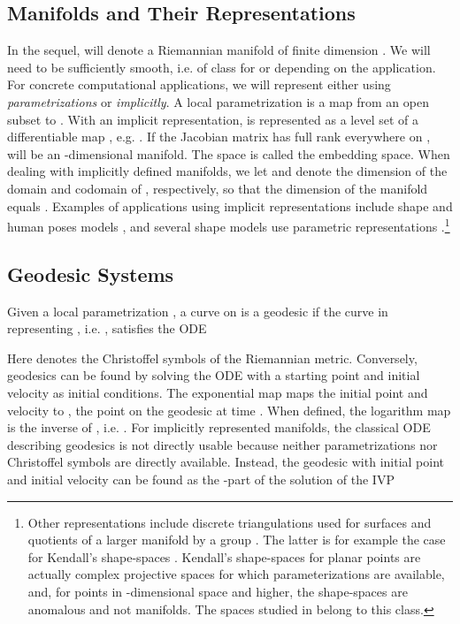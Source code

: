\documentclass[final]{svjour3}
\begin{document}
\subsection{Manifolds and Their Representations}
\label{sec:rep}
In the sequel,  will denote a Riemannian manifold of finite dimension . We will need  
to be sufficiently smooth, i.e. of class  for  or  depending on the
application. For concrete computational applications, we will represent 
 either using \emph{parametrizations} or \emph{implicitly}.
A local parametrization is a map  from an open subset
 to . With an implicit representation,
 is represented as a level set of a differentiable map , e.g.
. If the Jacobian matrix 
 has full rank  everywhere on ,  will be an -dimensional
manifold. The space  is called the embedding space.
When dealing with implicitly defined manifolds, we let  and  
denote the dimension of the domain and codomain of , respectively, so that
the dimension  of the manifold equals .
Examples of applications using implicit representations include
shape and human poses models \cite{sommer_bicycle_2009,hauberg_natural_2012}, and
several shape models use parametric representations
\cite{joshi_multiscale_2002,klassen_analysis_2004}.\footnote{Other 
representations include discrete triangulations used for surfaces and
quotients  of a larger manifold  by a group . The
latter is for example the case for Kendall's shape-spaces 
\cite{kendall_shape_1984}. Kendall's shape-spaces for planar points are actually
complex projective spaces  for which parameterizations are
available, and, for points in -dimensional space and higher, the shape-spaces
are anomalous and not manifolds. The spaces studied in
\cite{huckemann_intrinsic_2010} belong to this class.}

\subsection{Geodesic Systems}
\label{sec:geodesic-systems}
Given a local parametrization , a curve  on
 is a geodesic if the curve  in  representing , i.e.
, satisfies the ODE

Here  denotes the Christoffel symbols of the Riemannian metric.
Conversely, geodesics can be found by solving the ODE with a starting point
 and initial velocity  as initial conditions. 
The exponential map  maps the initial point  and velocity
 to 
, the
point on the geodesic at time .
When defined, the logarithm map  is the inverse of
, i.e. .
For implicitly represented manifolds, the classical ODE describing geodesics is 
not directly usable because neither parametrizations nor Christoffel symbols 
are directly available. Instead, the geodesic with initial point  and
initial velocity  can be found as the -part of the solution 
of the IVP
\end{document}
